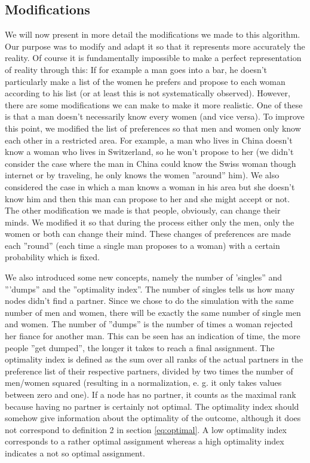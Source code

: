 \documentclass[11pt]{article}
\begin{document}
\subsection{Modifications} \label{mods}

We will now present in more detail the modifications we made to this algorithm. Our purpose was 
to modify and adapt it so that it represents more accurately the reality. Of course it is fundamentally 
impossible to make a perfect representation of reality through this: If for example a man 
goes into a bar, he doesn't particularly make a list of the women he prefers and propose to each 
woman according to his list (or at least this is not systematically observed). 
However, there are some modifications we can make to make it more realistic. One of these is that 
a man doesn't necessarily know every women (and vice versa). To improve this point, we modified 
the list of preferences so that men and women only know each other in a restricted area. For 
example, a man who lives in China doesn't know a woman who lives in Switzerland, so he won't 
propose to her (we didn't consider the case where the man in China could know the Swiss 
woman though internet or by traveling, he only knows the women ''around'' him). We also considered 
the case in which a man knows a woman in his area but she doesn't know him and then this man can 
propose to her and she might accept or not. 
The other modification we made is that people, obviously, can change their minds. We modified it so 
that during the process either only the men, only the women or both can change their mind. These 
changes of preferences are made each ''round'' (each time a single man proposes to a woman) with a 
certain probability which is fixed.

We also introduced some new concepts, namely the number of 'singles'' and '''dumps'' and the ''optimality index''. 
The number of singles tells us how many nodes didn't find a partner. Since we chose
to do the simulation with the same number of men and women, there will be exactly the same number of single
men and women.
The number of ''dumps'' is the number of times a woman rejected her fiance for another man. This can 
be seen has an indication of time, the more people ''get dumped'', the longer it takes to reach a final 
assignment. 
The optimality index is defined as the sum over all ranks of the actual partners
in the preference list of their respective partners, divided by two times the number of men/women squared (resulting in a normalization, e. g. 
it only takes values between zero and one). If a node has no partner, it counts as the maximal rank because having no partner is
certainly not optimal. The optimality index should somehow give information about the optimality of the outcome, although it does
not correspond to definition 2 in section \ref{eq:optimal}. A low optimality index corresponds to a rather optimal assignment whereas a high
optimality index indicates a not so optimal assignment.
\end{document}
